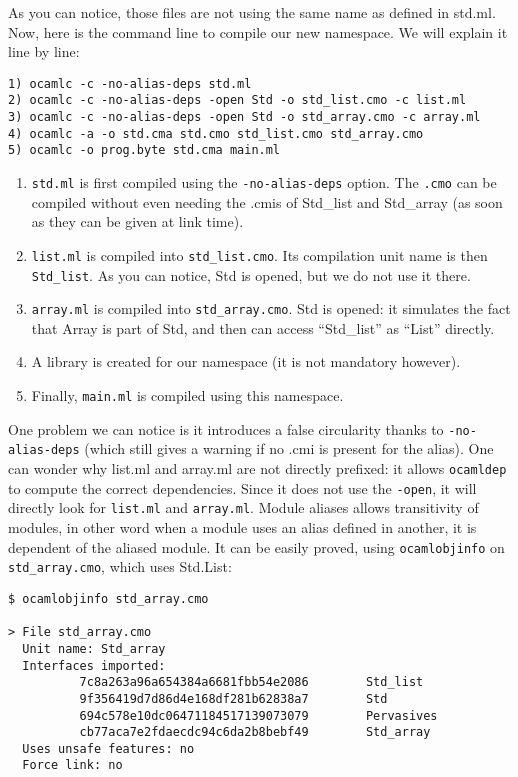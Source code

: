 \documentclass[11pt,a4paper]{article}
\begin{document}
As you can notice, those files are not using the same name as defined in
std.ml. Now, here is the command line to compile our new namespace. We will
explain it line by line:

\begin{verbatim}
1) ocamlc -c -no-alias-deps std.ml
2) ocamlc -c -no-alias-deps -open Std -o std_list.cmo -c list.ml
3) ocamlc -c -no-alias-deps -open Std -o std_array.cmo -c array.ml
4) ocamlc -a -o std.cma std.cmo std_list.cmo std_array.cmo
5) ocamlc -o prog.byte std.cma main.ml
\end{verbatim}

\begin{enumerate}
\item \texttt{std.ml} is first compiled using the \texttt{-no-alias-deps}
  option. The \texttt{.cmo} can be compiled without even needing the .cmis of Std\_list
  and Std\_array (as soon as they can be given at link time).
\item \texttt{list.ml} is compiled into \texttt{std\_list.cmo}. Its compilation
  unit name is then \lstinline{Std_list}. As you can notice, Std is opened, but
  we do not use it there.
\item \texttt{array.ml} is compiled into \texttt{std\_array.cmo}. Std is opened:
  it simulates the fact that Array is part of Std, and then can access
  ``Std\_list'' as ``List'' directly.
\item A library is created for our namespace (it is not mandatory however).
\item Finally, \texttt{main.ml} is compiled using this namespace.
\end{enumerate}

One problem we can notice is it introduces a false circularity thanks to
\texttt{-no-alias-deps} (which still gives a warning if no .cmi is present for
the alias). One can wonder why list.ml and array.ml are not directly prefixed:
it allows \texttt{ocamldep} to compute the correct dependencies. Since it does
not use the \texttt{-open}, it will directly look for \texttt{list.ml} and
\texttt{array.ml}. Module aliases allows transitivity of modules, in other word
when a module uses an alias defined in another, it is dependent of the aliased
module. It can be easily proved, using \texttt{ocamlobjinfo} on
\texttt{std\_array.cmo}, which uses Std.List:

\begin{verbatim}
$ ocamlobjinfo std_array.cmo

> File std_array.cmo
  Unit name: Std_array
  Interfaces imported:
          7c8a263a96a654384a6681fbb54e2086        Std_list
          9f356419d7d86d4e168df281b62838a7        Std
          694c578e10dc06471184517139073079        Pervasives
          cb77aca7e2fdaecdc94c6da2b8bebf49        Std_array
  Uses unsafe features: no
  Force link: no
\end{verbatim}
\end{document}
